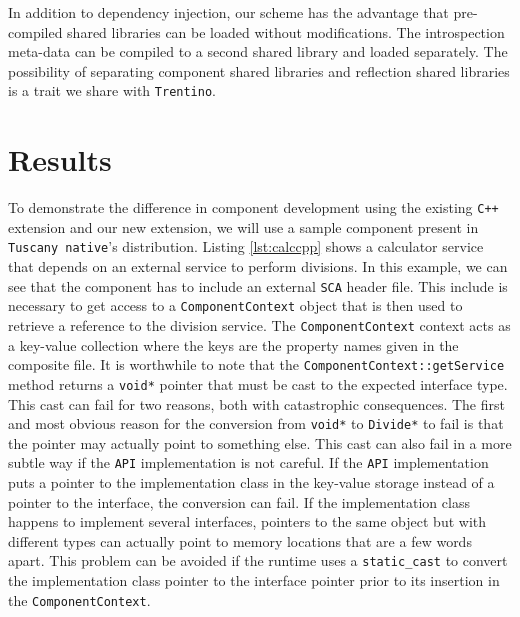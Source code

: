 In addition to dependency injection, our scheme has the advantage that pre-compiled shared libraries can be loaded without
modifications. The introspection meta-data can be compiled to a second shared library and loaded separately.
The possibility of separating component shared libraries and reflection shared libraries is a trait we share with
\texttt{Trentino}.

\section{Results}

To demonstrate the difference in component development using the existing \texttt{C++} extension and our
new extension, we will use a sample component present in \texttt{Tuscany native}'s distribution. Listing
\ref{lst:calccpp} shows a calculator service that depends on an external service to perform
divisions. In this example, we can see that the component has to include an external \texttt{SCA} header
file. This include is necessary to get access to a \texttt{ComponentContext} object that is then
used to retrieve a reference to the division service. The \texttt{ComponentContext} context acts
as a key-value collection where the keys are the property names given in the composite file.
It is worthwhile to note that the \texttt{ComponentContext::getService} method returns a \texttt{void*}
pointer that must be cast to the expected interface type. This cast can fail for two reasons, both
with catastrophic consequences. The first and most obvious reason for the conversion from \texttt{void*} to
\texttt{Divide*} to fail is that the pointer may actually point to something else.
This cast can also fail in a more subtle way if the \texttt{API} implementation is not careful. If the
\texttt{API} implementation puts a pointer to the implementation class in the key-value storage instead of
a pointer to the interface, the conversion can fail. If the implementation class happens to
implement several interfaces, pointers to the same object but with different types can actually
point to memory locations that are a few words apart. This problem can be avoided if the runtime
uses a \texttt{static\_cast} to convert the implementation class pointer to the interface pointer
prior to its insertion in the \texttt{ComponentContext}.

